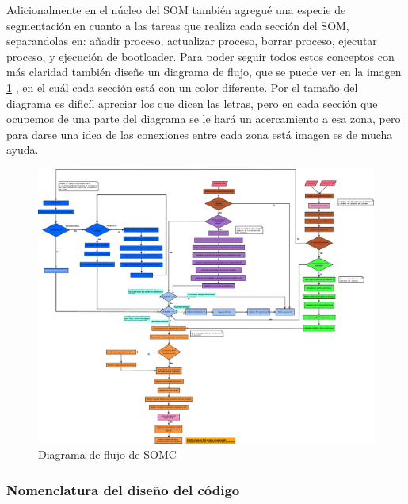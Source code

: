 \documentclass[letterpaper,12pt,oneside]{book}
\begin{document}
		
		Adicionalmente en el núcleo del SOM también agregué una especie de segmentación en cuanto a las tareas que realiza cada sección del SOM, separandolas en:
		añadir proceso, actualizar proceso, borrar proceso, ejecutar proceso, y ejecución de bootloader. Para poder seguir todos estos conceptos con más claridad
		también diseñe un diagrama de flujo, que se puede ver en la imagen \ref{fig:diagramaSOMC}
		, en el cuál cada sección está con un color diferente. Por el tamaño del diagrama es dificíl apreciar los que dicen las letras, pero
		en cada sección que ocupemos de una parte del diagrama se le hará un acercamiento a esa zona, pero para darse una idea
		de las conexiones entre cada zona está imagen es de mucha ayuda.
		

		\begin{figure}[p]		
			\centering
			\includegraphics[width=\textwidth,height=\textheight,keepaspectratio]{media/CARDIACC/Diagrama_Flujo_SO.eps}
			\caption{Diagrama de flujo de SOMC}
			\label{fig:diagramaSOMC}
		\end{figure}		
		

		
		\subsubsection{Nomenclatura del diseño del código}
		
\end{document}
